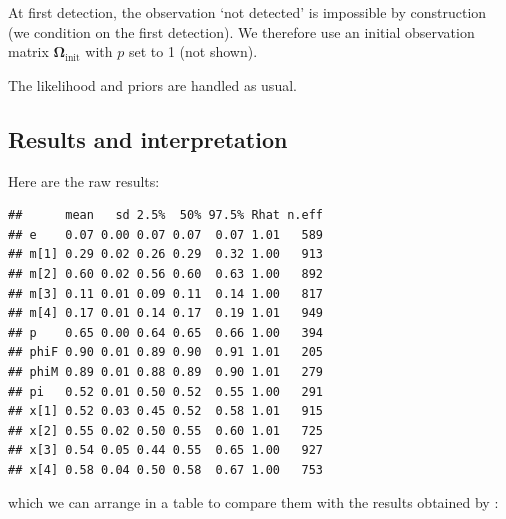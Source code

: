 \documentclass[
  12pt,
]{krantz}
\begin{document}
At first detection, the observation `not detected' is impossible by construction (we condition on the first detection). We therefore use an initial observation matrix \(\mathbf{\Omega}_{\text{init}}\) with \(p\) set to 1 (not shown).

The likelihood and priors are handled as usual.

\subsection{Results and interpretation}\label{results-and-interpretation-2}

Here are the raw results:

\begin{verbatim}
##      mean   sd 2.5%  50% 97.5% Rhat n.eff
## e    0.07 0.00 0.07 0.07  0.07 1.01   589
## m[1] 0.29 0.02 0.26 0.29  0.32 1.00   913
## m[2] 0.60 0.02 0.56 0.60  0.63 1.00   892
## m[3] 0.11 0.01 0.09 0.11  0.14 1.00   817
## m[4] 0.17 0.01 0.14 0.17  0.19 1.01   949
## p    0.65 0.00 0.64 0.65  0.66 1.00   394
## phiF 0.90 0.01 0.89 0.90  0.91 1.01   205
## phiM 0.89 0.01 0.88 0.89  0.90 1.01   279
## pi   0.52 0.01 0.50 0.52  0.55 1.00   291
## x[1] 0.52 0.03 0.45 0.52  0.58 1.01   915
## x[2] 0.55 0.02 0.50 0.55  0.60 1.01   725
## x[3] 0.54 0.05 0.44 0.55  0.65 1.00   927
## x[4] 0.58 0.04 0.50 0.58  0.67 1.00   753
\end{verbatim}

which we can arrange in a table to compare them with the results obtained by \citet{pradel2008sex}:
\end{document}
